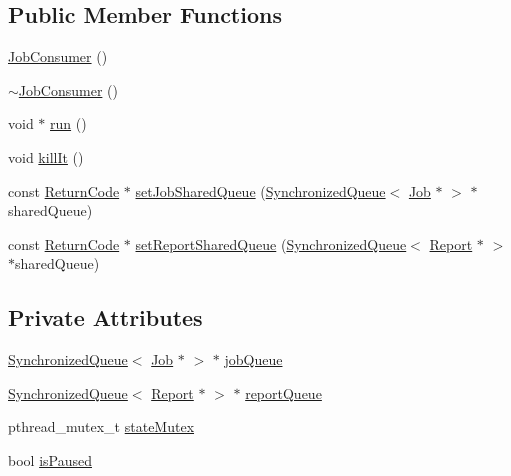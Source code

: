 \subsection*{Public Member Functions}
\begin{DoxyCompactItemize}
\item 
\hyperlink{classit_1_1testbench_1_1rte_1_1JobConsumer_a806f801b6eaccb955129b938f61853d6}{Job\-Consumer} ()
\item 
\hyperlink{classit_1_1testbench_1_1rte_1_1JobConsumer_a9affbf15fe187bec478f0be87bf703c2}{$\sim$\-Job\-Consumer} ()
\item 
void $\ast$ \hyperlink{classit_1_1testbench_1_1rte_1_1JobConsumer_a4457082ac2f792d8911c01b02811b94c}{run} ()
\item 
void \hyperlink{classit_1_1testbench_1_1rte_1_1JobConsumer_ae51fe7c6ab7dda2a7495f781f28ea7d3}{kill\-It} ()
\item 
const \hyperlink{structit_1_1testbench_1_1data_1_1ReturnCode}{Return\-Code} $\ast$ \hyperlink{classit_1_1testbench_1_1rte_1_1JobConsumer_a5a171ff9d25f217361c41d0dcbed4988}{set\-Job\-Shared\-Queue} (\hyperlink{classit_1_1testbench_1_1rte_1_1SynchronizedQueue}{Synchronized\-Queue}$<$ \hyperlink{classit_1_1testbench_1_1rte_1_1Job}{Job} $\ast$ $>$ $\ast$shared\-Queue)
\item 
const \hyperlink{structit_1_1testbench_1_1data_1_1ReturnCode}{Return\-Code} $\ast$ \hyperlink{classit_1_1testbench_1_1rte_1_1JobConsumer_a9afd801517a4838a1dc301d531585fe9}{set\-Report\-Shared\-Queue} (\hyperlink{classit_1_1testbench_1_1rte_1_1SynchronizedQueue}{Synchronized\-Queue}$<$ \hyperlink{classit_1_1testbench_1_1data_1_1Report}{Report} $\ast$ $>$ $\ast$shared\-Queue)
\end{DoxyCompactItemize}
\subsection*{Private Attributes}
\begin{DoxyCompactItemize}
\item 
\hyperlink{classit_1_1testbench_1_1rte_1_1SynchronizedQueue}{Synchronized\-Queue}$<$ \hyperlink{classit_1_1testbench_1_1rte_1_1Job}{Job} $\ast$ $>$ $\ast$ \hyperlink{classit_1_1testbench_1_1rte_1_1JobConsumer_a31303a86a0747233efbb960977dec9e3}{job\-Queue}
\item 
\hyperlink{classit_1_1testbench_1_1rte_1_1SynchronizedQueue}{Synchronized\-Queue}$<$ \hyperlink{classit_1_1testbench_1_1data_1_1Report}{Report} $\ast$ $>$ $\ast$ \hyperlink{classit_1_1testbench_1_1rte_1_1JobConsumer_a06fecb4c1c61ddff302a3bc6a44cad6a}{report\-Queue}
\item 
pthread\-\_\-mutex\-\_\-t \hyperlink{classit_1_1testbench_1_1rte_1_1JobConsumer_a3bd07571a6b91de9dd7b6a19b7a6df53}{state\-Mutex}
\item 
bool \hyperlink{classit_1_1testbench_1_1rte_1_1JobConsumer_a2be8d6e14890fc6431f5e24e5d8066c6}{is\-Paused}
\end{DoxyCompactItemize}
